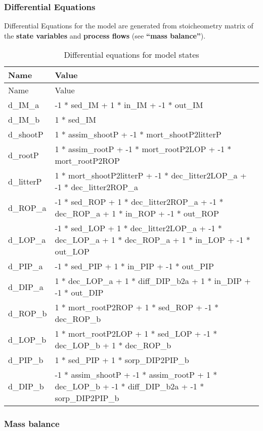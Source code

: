\documentclass[
]{article}
\begin{document}
\hypertarget{differential-equations}{%
\subsubsection{Differential Equations}\label{differential-equations}}

Differential Equations for the model are generated from stoicheometry
matrix of the \textbf{state variables} and \textbf{process flows} (see
\textbf{``mass balance''}).

\begin{longtable}[]{@{}ll@{}}
\caption{Differential equations for model states}\tabularnewline
\toprule\noalign{}
Name & Value \\
\midrule\noalign{}
\endfirsthead
\toprule\noalign{}
Name & Value \\
\midrule\noalign{}
\endhead
\bottomrule\noalign{}
\endlastfoot
d\_IM\_a & -1 * sed\_IM + 1 * in\_IM + -1 * out\_IM \\
d\_IM\_b & 1 * sed\_IM \\
d\_shootP & 1 * assim\_shootP + -1 * mort\_shootP2litterP \\
d\_rootP & 1 * assim\_rootP + -1 * mort\_rootP2LOP + -1 *
mort\_rootP2ROP \\
d\_litterP & 1 * mort\_shootP2litterP + -1 * dec\_litter2LOP\_a + -1 *
dec\_litter2ROP\_a \\
d\_ROP\_a & -1 * sed\_ROP + 1 * dec\_litter2ROP\_a + -1 * dec\_ROP\_a +
1 * in\_ROP + -1 * out\_ROP \\
d\_LOP\_a & -1 * sed\_LOP + 1 * dec\_litter2LOP\_a + -1 * dec\_LOP\_a +
1 * dec\_ROP\_a + 1 * in\_LOP + -1 * out\_LOP \\
d\_PIP\_a & -1 * sed\_PIP + 1 * in\_PIP + -1 * out\_PIP \\
d\_DIP\_a & 1 * dec\_LOP\_a + 1 * diff\_DIP\_b2a + 1 * in\_DIP + -1 *
out\_DIP \\
d\_ROP\_b & 1 * mort\_rootP2ROP + 1 * sed\_ROP + -1 * dec\_ROP\_b \\
d\_LOP\_b & 1 * mort\_rootP2LOP + 1 * sed\_LOP + -1 * dec\_LOP\_b + 1 *
dec\_ROP\_b \\
d\_PIP\_b & 1 * sed\_PIP + 1 * sorp\_DIP2PIP\_b \\
d\_DIP\_b & -1 * assim\_shootP + -1 * assim\_rootP + 1 * dec\_LOP\_b +
-1 * diff\_DIP\_b2a + -1 * sorp\_DIP2PIP\_b \\
\end{longtable}

\hypertarget{mass-balance}{%
\subsubsection{Mass balance}\label{mass-balance}}
\end{document}
